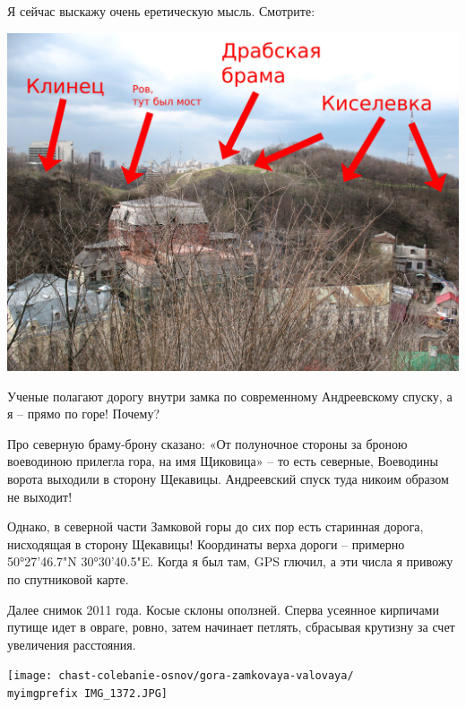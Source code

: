 Я сейчас выскажу очень еретическую мысль. Смотрите:

\begin{center}
\includegraphics[width=\linewidth]{chast-colebanie-osnov/gora-zamkovaya-valovaya/zamok-scheme.jpg}
\end{center}


Ученые полагают дорогу внутри замка по современному Андреевскому спуску, а я – прямо по горе! Почему?

Про северную браму-брону сказано: «От полуночное стороны за броною воеводиною прилегла гора, на имя Щиковица» – то есть северные, Воеводины ворота выходили в сторону Щекавицы. Андреевский спуск туда никоим образом не выходит!

Однако, в северной части Замковой горы до сих пор есть старинная дорога, нисходящая в сторону Щекавицы! Координаты верха дороги – примерно 50°27'46.7"N 30°30'40.5"E. Когда я был там, GPS глючил, а эти числа я привожу по спутниковой карте.

Далее снимок 2011 года. Косые склоны оползней. Сперва усеянное кирпичами путище идет в овраге, ровно, затем начинает петлять, сбрасывая крутизну за счет увеличения расстояния.

\begin{center}
\texttt{[image: chast-colebanie-osnov/gora-zamkovaya-valovaya/\\myimgprefix IMG\_1372.JPG]}
\end{center}

